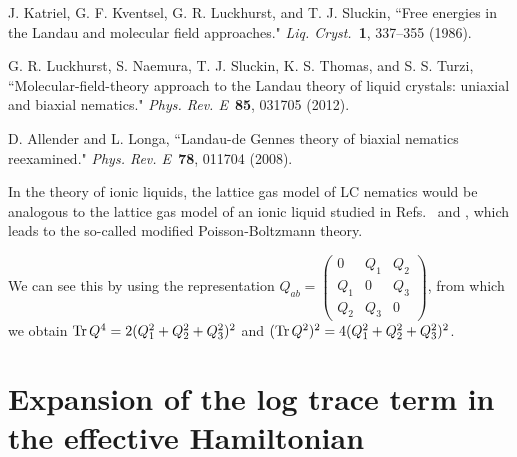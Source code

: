 \documentclass[jcp,aps,twocolumn,showpacs,supergroupedaddress,epsfig,amsmath,amssymb,eqsecnum]{revtex4}
\newcommand{\Tr}{{\rm{Tr}\,}}
\begin{document}
\begin{thebibliography}{99}
J. Katriel, G. F. Kventsel, G. R. Luckhurst, and T. J. Sluckin, 
``Free energies in the Landau and molecular field approaches." 
{\em Liq. Cryst.}~{\bf 1}, 337--355 (1986). 

G. R. Luckhurst, S. Naemura, T. J. Sluckin, K. S. Thomas, and S. S. Turzi, 
``Molecular-field-theory approach to the Landau theory of liquid crystals: uniaxial and biaxial nematics." 
{\em Phys. Rev. E}~{\bf 85}, 031705 (2012).

D. Allender and L. Longa, ``Landau-de Gennes theory of biaxial nematics reexamined." 
{\em Phys. Rev. E}~{\bf 78}, 011704 (2008). 

In the theory of ionic liquids, the lattice gas model of LC nematics would be analogous to the lattice gas model of an ionic liquid studied in Refs.~\cite{borukhov1997} and \cite{borukhov2000}, which leads to the so-called modified Poisson-Boltzmann theory.

We can see this by using the representation $Q_{ab} = \left( 
\begin{array}{ccc}
0 & Q_1 & Q_2 \\
Q_1 & 0 & Q_3 \\
Q_2 & Q_3 & 0 
\end{array} 
\right)$, from which we obtain $\Tr Q^4 = 2(Q_1^2+Q_2^2+Q_3^2)^2$ and $(\Tr Q^2)^2 = 4(Q_1^2+Q_2^2+Q_3^2)^2$.

\end{thebibliography}

\appendix

\section{Expansion of the log trace term in the effective Hamiltonian}
\label{app:Hexpansion}
\end{document}
